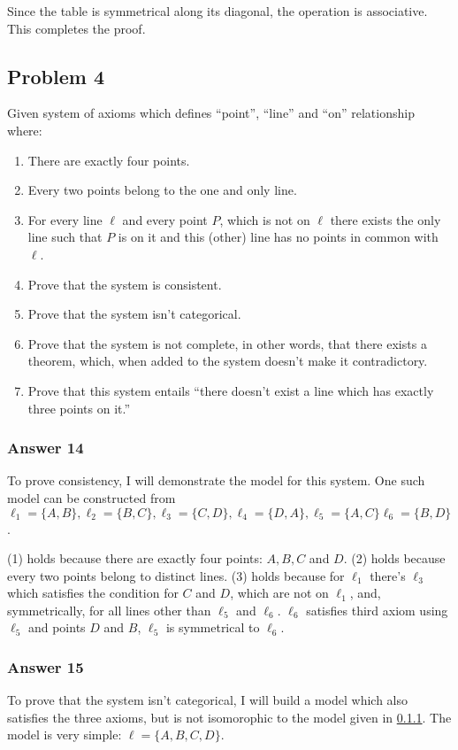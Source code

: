 \documentclass[11pt]{article}
\begin{document}
Since the table is symmetrical along its diagonal, the operation is associative.
This completes the proof.
\subsection{Problem 4}
\label{sec-1-4}
Given system of axioms which defines ``point'', ``line'' and ``on''
relationship where:
\begin{enumerate}
\item There are exactly four points.
\item Every two points belong to the one and only line.
\item For every line $\ell$ and every point $P$, which is not on $\ell$
there exists the only line such that $P$ is on it and this (other)
line has no points in common with $\ell$.

\item Prove that the system is consistent.
\item Prove that the system isn't categorical.
\item Prove that the system is not complete, in other words, that there
exists a theorem, which, when added to the system doesn't make it
contradictory.
\item Prove that this system entails ``there doesn't exist a line which
has exactly three points on it.''
\end{enumerate}

\subsubsection{Answer 14}
\label{sec-1-4-1}
To prove consistency, I will demonstrate the model for this system.
One such model can be constructed from
$\ell_1=\{A,B\},\ell_2=\{B,C\},\ell_3=\{C,D\},\ell_4=\{D,A\},\ell_5=\{A,C\}\ell_6=\{B,D\}$.

(1) holds because there are exactly four points: $A,B,C$ and $D$.
(2) holds because every two points belong to distinct lines.
(3) holds because for $\ell_1$ there's $\ell_3$ which satisfies
the condition for $C$ and $D$, which are not on $\ell_1$, and,
symmetrically, for all lines other than $\ell_5$ and $\ell_6$.
$\ell_6$ satisfies third axiom using $\ell_5$ and points $D$ and $B$,
$\ell_5$ is symmetrical to $\ell_6$.
\subsubsection{Answer 15}
\label{sec-1-4-2}
To prove that the system isn't categorical, I will build a model
which also satisfies the three axioms, but is not isomorophic to
the model given in \ref{sec-1-4-1}.  The model is very simple:
$\ell=\{A,B,C,D\}$.
\end{document}
